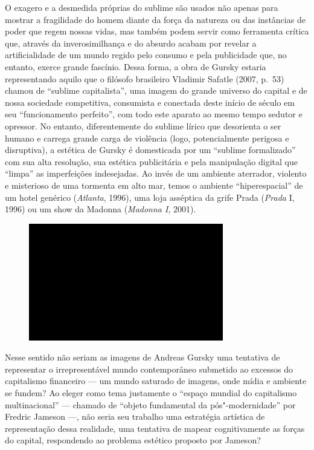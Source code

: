O exagero e a desmedida próprias do sublime são usados não apenas para
mostrar a fragilidade do homem diante da força da natureza ou das
instâncias de poder que regem nossas vidas, mas também podem servir como
ferramenta crítica que, através da inverosimilhança e do absurdo acabam
por revelar a artificialidade de um mundo regido pelo consumo e pela
publicidade que, no entanto, exerce grande fascínio. Dessa forma, a obra
de Gursky estaria representando aquilo que o filósofo brasileiro
Vladimir Safatle (2007, p.~53) chamou de ``sublime capitalista'', uma
imagem do grande universo do capital e de nossa sociedade competitiva,
consumista e conectada deste início de século  em seu ``funcionamento
perfeito'', com todo este aparato ao mesmo tempo sedutor e opressor. No
entanto, diferentemente do sublime lírico que desorienta o ser humano e
carrega grande carga de violência (logo, potencialmente perigosa e
disruptiva), a estética de Gursky é domesticada por um ``sublime
formalizado'' com sua alta resolução, sua estética publicitária e pela
manipulação digital que ``limpa'' as imperfeições indesejadas. Ao invés
de um ambiente aterrador, violento e misterioso de uma tormenta em alto
mar, temos o ambiente ``hiperespacial'' de um hotel genérico
(\emph{Atlanta}, 1996), uma loja asséptica da grife Prada (\emph{Prada}
I, 1996) ou um show da Madonna (\emph{Madonna I}, 2001).

\begin{figure}[!ht]
\centering
 \includegraphics[width=85mm]{./imgs/im1.jpg}
\caption{\tiny{}}
\end{figure}

Nesse sentido não seriam as imagens de Andreas Gursky uma tentativa de
representar o irrepresentável mundo contemporâneo submetido ao excessos
do capitalismo financeiro --- um mundo saturado de imagens, onde mídia e
ambiente se fundem? Ao eleger como tema justamente o ``espaço mundial do
capitalismo multinacional'' --- chamado de ``objeto fundamental da
pós"-modernidade'' por Fredric Jameson ---, não seria seu trabalho uma
estratégia artística de representação dessa realidade, uma tentativa de
mapear cognitivamente as forças do capital, respondendo ao problema
estético proposto por Jameson?

